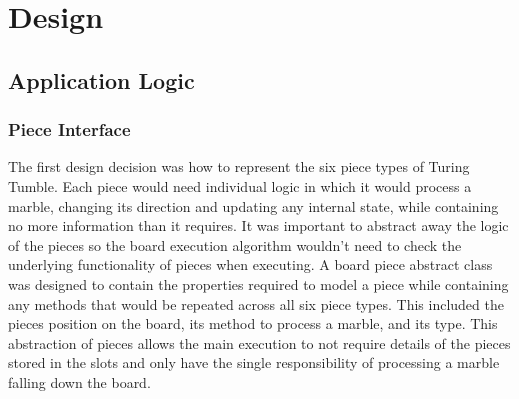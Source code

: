 \documentclass{l4proj}
\begin{document}
\chapter{Design}
\section{Application Logic}
\label{section:design}

\subsection{Piece Interface}
The first design decision was how to represent the six piece types of Turing Tumble. Each piece would need individual logic in which it would process a marble, changing its direction and updating any internal state, while containing no more information than it requires. It was important to abstract away the logic of the pieces so the board execution algorithm wouldn't need to check the underlying functionality of pieces when executing. A board piece abstract class was designed to contain the properties required to model a piece while containing any methods that would be repeated across all six piece types. This included the pieces position on the board, its method to process a marble, and its type. This abstraction of pieces allows the main execution to not require details of the pieces stored in the slots and only have the single responsibility of processing a marble falling down the board.
\end{document}

